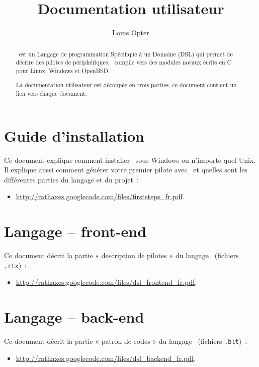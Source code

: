 \documentclass[francais]{rtxarticle}
\title{Documentation utilisateur}
\author{Louis Opter}
\begin{document}
\maketitle

\begin{abstract}
\rtx\ est un Langage de programmation Spécifique à un Domaine (DSL) qui permet
de décrire des pilotes de périphériques. \rtx\ compile vers des modules noyaux
écrits en C pour Linux, Windows et OpenBSD.

La documentation utilisateur est découpée en trois parties, ce document contient
un lien vers chaque document.
\end{abstract}

\section*{Guide d'installation}

Ce document explique comment installer \rtx\ sous Windows ou n'importe quel
Unix. Il explique aussi comment générer votre premier pilote avec \rtx\ et
quelles sont les différentes parties du langage et du projet~:
\begin{itemize}
\item {\small\url{http://rathaxes.googlecode.com/files/firststeps_fr.pdf}}.
\end{itemize}

\section*{Langage -- front-end}

Ce document décrit la partie « description de pilotes » du langage \rtx\
(fichiers \texttt{.rtx})~:
\begin{itemize}
\item {\small\url{http://rathaxes.googlecode.com/files/dsl_frontend_fr.pdf}}.
\end{itemize}

\section*{Langage -- back-end}

Ce document décrit la partie « patron de codes » du langage \rtx\ (fichiers
\texttt{.blt})~:
\begin{itemize}
\item {\small\url{http://rathaxes.googlecode.com/files/dsl_backend_fr.pdf}}.
\end{itemize}

\rtxmaketitleblock
\end{document}
